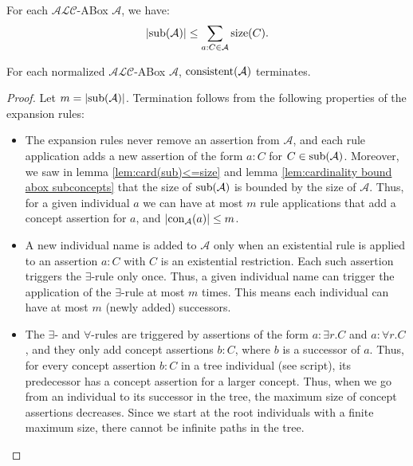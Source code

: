 \begin{lemma}\label{lem:cardinality bound abox subconcepts}
	For each $\mathcal{ALC}$-ABox $\mathcal{A}$, we have:
	\[
		\lvert \operatorname{\text{sub}}(\mathcal{A}) \rvert \leq \sum_{a:C \in \mathcal{A}} \operatorname{\text{size}}(C) 
	.\]
\end{lemma}

\begin{lemma}[Termination]
	For each normalized $\mathcal{ALC}$-ABox $\mathcal{A}$, $\operatorname{\text{consistent}}(\mathcal{A})$ terminates.
\end{lemma}
\begin{proof}
	Let $m = \lvert \operatorname{\text{sub}}(\mathcal{A}) \rvert$.
	Termination follows from the following properties of the expansion rules:
	\begin{itemize}
		\item The expansion rules never remove an assertion from $\mathcal{A}$,
			and each rule application adds a new assertion of the form $a:C$ for $C \in \operatorname{\text{sub}}(\mathcal{A})$.
			Moreover, we saw in lemma \ref{lem:card(sub)<=size} and lemma \ref{lem:cardinality bound abox subconcepts} that the size of $\operatorname{\text{sub}}(\mathcal{A})$ is bounded by the size of $\mathcal{A}$.
			Thus, for a given individual $a$ we can have at most $m$ rule applications that add a concept assertion for $a$,
			and $\lvert \operatorname{\text{con}}_{\mathcal{A}}(a) \rvert \leq m$.
		\item A new individual name is added to $\mathcal{A}$ only when an existential rule is applied to an assertion $a:C$ with $C$ is an existential restriction.
			Each such assertion triggers the $\exists$-rule only once.
			Thus, a given individual name can trigger the application of the $\exists$-rule at most $m$ times.
			This means each individual can have at most $m$ (newly added) successors.
		\item The $\exists$- and $\forall$-rules are triggered by assertions of the form $a : \exists r.C$ and $a : \forall r.C$, and they only add concept assertions $b:C$, where $b$ is a successor of $a$.
			Thus, for every concept assertion $b:C$ in a tree individual (see script), its predecessor has a concept assertion for a larger concept.
			Thus, when we go from an individual to its successor in the tree, the maximum size of concept assertions decreases.
			Since we start at the root individuals with a finite maximum size, there cannot be infinite paths in the tree. \qedhere
	\end{itemize}
\end{proof}

